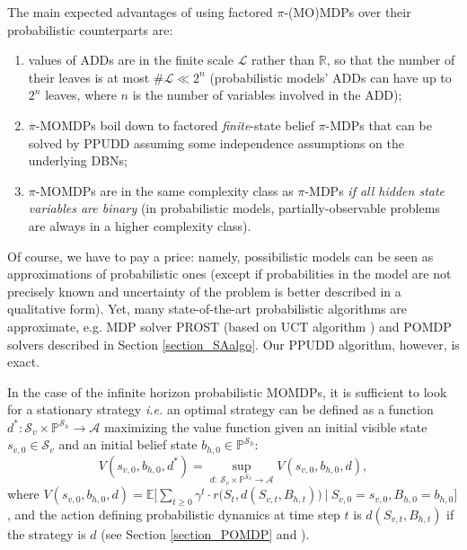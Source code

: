 The main expected advantages of using factored
$\pi$-(MO)MDPs over their probabilistic counterparts are: 
\begin{enumerate}
\item values of ADDs are
in the finite scale $\mathcal{L}$ rather than $\mathbb{R}$, so that the number of
their leaves is at most $\#\mathcal{L} \ll 2^n$ (probabilistic models' ADDs can have
up to $2^n$ leaves, where $n$ is the number of variables involved in the ADD);
\item $\pi$-MOMDPs boil down to factored \emph{finite}-state
belief $\pi$-MDPs that can be solved by PPUDD assuming some independence
assumptions on the underlying DBNs; 
\item $\pi$-MOMDPs are in the same
complexity class as $\pi$-MDPs \textit{if all hidden state variables are binary}
(in probabilistic models, partially-observable problems are always in a higher
complexity class). 
\end{enumerate}
Of course, we have to pay a price: namely, possibilistic models can be seen as approximations 
of probabilistic ones 
(except if probabilities in the model are not precisely known
and uncertainty of the problem is better described in a qualitative form). 
Yet, many state-of-the-art probabilistic
algorithms are approximate, 
e.g. MDP solver PROST \cite{DBLP:conf/aips/KellerE12} (based on UCT algorithm \cite{Kocsis:2006:BBM:2091602.2091633})
and POMDP solvers described in Section \ref{section_SAalgo}.
Our PPUDD algorithm, however, is exact.

In the case of the infinite horizon probabilistic MOMDPs, 
it is sufficient to look for a stationary strategy
\textit{i.e.} an optimal strategy can be defined as a function
$d^*: \mathcal{S}_v \times \mathbb{P}^{\mathcal{S}_h} \rightarrow \mathcal{A}$
maximizing the value function given an initial visible state $s_{v,0} \in \mathcal{S}_v$ 
and an initial belief state $b_{h,0} \in \mathbb{P}^{\mathcal{S}_h}$:
\[ V(s_{v,0},b_{h,0},d^*) = \displaystyle \sup_{d: \ \mathcal{S}_v \times \mathbb{P}^{\mathcal{S}_h} \rightarrow \mathcal{A}} V(s_{v,0},b_{h,0},d), \]
where $V(s_{v,0},b_{h,0},d) = \mathbb{E} \bigg[ \displaystyle  \sum_{t \geqslant 0} \gamma^t \cdot r\Big(S_t,d(S_{v,t},B_{h,t})\Big) \ \bigg\vert \ S_{v,0} = s_{v,0}, B_{h,0} = b_{h,0} \bigg] $,
and the action defining probabilistic dynamics at time step $t$ is $d(S_{v,t},B_{h,t})$ if the strategy is $d$ (see Section \ref{section_POMDP}
and \cite{OngShaoHsuWee-IJRR10,AraThoBufCha-ICTAI10}).

